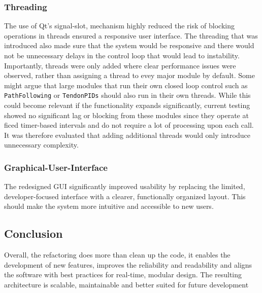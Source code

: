 \subsubsection{Threading}
The use of Qt's signal-slot, mechanism highly reduced the risk of blocking operations in threads ensured a responsive user interface. The threading that was introduced also made sure that the system would be responsive and there would not be unnecessary delays in the control loop that would lead to instability. Importantly, threads were only added where clear performance issues were observed, rather than assigning a thread to evey major module by default.
\newline \newline 
Some might argue that large modules that run their own closed loop control such as \texttt{PathFollowing} or \texttt{TendonPIDs} should also run in their own threads. While this could become relevant if the functionality expands significantly, current testing showed no significant lag or blocking from these modules since they operate at ficed timer-based intervals and do not require a lot of processing upon each call. It was therefore evaluated that adding additional threads would only introduce unnecessary complexity.

\subsubsection{Graphical-User-Interface}
The redesigned GUI significantly improved usability by replacing the limited, developer-focused interface with a clearer, functionally organized layout. This should make the system more intuitive and accessible to new users.

\subsection{Conclusion}
Overall, the refactoring does more than clean up the code, it enables the development of new features, improves the reliability and readability and aligns the software with best practices for real-time, modular design. The resulting architecture is scalable, maintainable and better suited for future development



